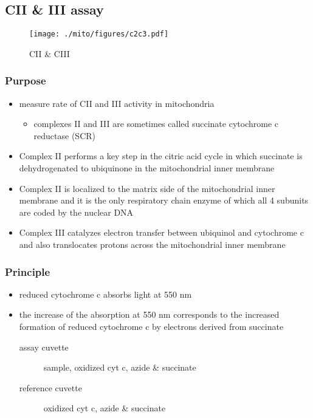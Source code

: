\documentclass[12pt]{scrartcl}
\begin{document}
\subsection{CII \& III assay}
\label{sec:orgbcea873}
\begin{figure}[htbp]
\centering
\texttt{[image: ./mito/figures/c2c3.pdf]}
\caption{\label{fig:org535d50f}CII \& CIII}
\end{figure}

\subsubsection{Purpose}
\label{sec:org077aa90}
\begin{itemize}
\item measure rate of CII and III activity in mitochondria 
\begin{itemize}
\item complexes II and III are sometimes called succinate cytochrome c reductase (SCR)
\end{itemize}
\item Complex II performs a key step in the citric acid cycle in which
succinate is dehydrogenated to ubiquinone in the mitochondrial inner
membrane
\item Complex II is localized to the matrix side of the mitochondrial
inner membrane and it is the only respiratory chain enzyme of which
all 4 subunits are coded by the nuclear DNA
\item Complex III catalyzes electron transfer between ubiquinol and
cytochrome c and also translocates protons across the mitochondrial
inner membrane
\end{itemize}

\subsubsection{Principle}
\label{sec:org4d7979e}
\begin{itemize}
\item reduced cytochrome c absorbs light at 550 nm
\item the increase of the absorption at 550 nm corresponds to the
increased formation of reduced cytochrome c by electrons derived
from succinate
\begin{description}
\item[{assay cuvette}] sample, oxidized cyt c, azide \& succinate
\item[{reference cuvette}] oxidized cyt c, azide \& succinate
\end{description}
\end{itemize}
\end{document}
